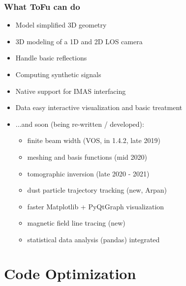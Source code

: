 \documentclass[10pt]{beamer}
\begin{document}
%	

\begin{frame}
\frametitle{What ToFu can do}
\begin{itemize}
	\item Model simplified 3D geometry
	\item 3D modeling of a 1D and 2D LOS camera
	\item Handle basic reflections
	\item Computing synthetic signals
	\item Native support for IMAS interfacing
	\item Data easy interactive visualization and basic treatment
	\pause
	\item ...and soon (being re-written / developed):
		\begin{itemize}
			\item finite beam width (VOS, in 1.4.2, late 2019)
			\item meshing and basis functions (mid 2020)
			\item tomographic inversion (late 2020 - 2021)
			\item dust particle trajectory tracking (new, Arpan)
			\item faster Matplotlib + PyQtGraph visualization
			\item magnetic field line tracing (new)
			\item statistical data analysis (pandas) integrated
		\end{itemize}
\end{itemize}
\end{frame}


\section{Code Optimization}
\end{document}
